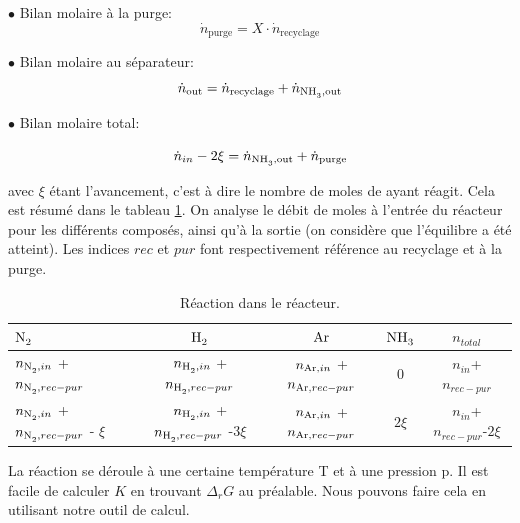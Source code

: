 $\bullet$ Bilan molaire à la purge:
\begin{equation}
\dot{n}_{\text{purge}} = X \cdot \dot{n}_{\text{recyclage}}
\label{eq:bilan_mol_purge}
\end{equation}

$\bullet$ Bilan molaire au séparateur:
\begin{equation}
\dot{n}_{\text{out}}=\dot{n}_{\text{recyclage}}+\dot{n}_{\ce{NH3},\text{out}}
\label{eq:bilan_mol_sep}
\end{equation}


$\bullet$ Bilan molaire total:

\begin{equation}
	\dot{n}_{in} - 2\xi=\dot{n}_{\ce{NH3},\text{out}} + \dot{n}_{\text{purge}}
	\label{eq:bilan_mol_tot}
\end{equation}

avec $\xi$ étant l'avancement, c'est à dire le nombre de moles de  ayant réagit. 
Cela est résumé dans le tableau \ref{tab:reaction_purge_eq}. 
On analyse le débit de moles à l'entrée du réacteur pour les différents composés, 
ainsi qu'à la sortie (on considère que l'équilibre a été atteint). 
Les indices $rec$ et $pur$ font respectivement référence au recyclage et à la purge. 

\begin{table}[h!]
	\centering
	\begin{tabular}{l|c|c|c|c}
		$\ce{N2}$ & $\ce{H2}$ & $\ce{Ar}$ & $\ce{NH3}$ & $n_{total}$ \\
		\hline
		$n_{\ce{N2},in}$ + $n_{\ce{N2},rec-pur}$ & $n_{\ce{H2},in}$ +$n_{\ce{H2},rec-pur}$ & $n_{\ce{Ar},in}$ + $n_{\ce{Ar},rec-pur}$ & $0$  & $n_{in}$+$n_{rec-pur}$\\
		$n_{\ce{N2},in}$ + $n_{\ce{N2},rec-pur}$ - $\xi$ & $n_{\ce{H2},in}$ +$n_{\ce{H2},rec-pur}$ -$3 \xi$ & $n_{\ce{Ar},in}$ + $n_{\ce{Ar},rec-pur}$ & $2 \xi$  & $n_{in}$+$n_{rec-pur}$-$2 \xi$\\
	\end{tabular}
	\caption{Réaction dans le réacteur.}
	\label{tab:reaction_purge_eq}
\end{table}

La réaction se déroule à une certaine température T et à une pression p. 
Il est facile de calculer $K$ en trouvant $\Delta_r G$ au préalable. 
Nous pouvons faire cela en utilisant notre outil de calcul.

